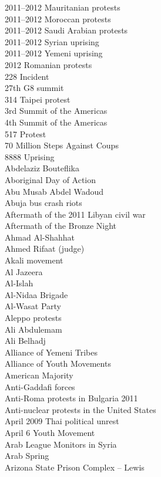 2011–2012 Mauritanian protests\\
2011–2012 Moroccan protests\\
2011–2012 Saudi Arabian protests\\
2011–2012 Syrian uprising\\
2011–2012 Yemeni uprising\\
2012 Romanian protests\\
228 Incident\\
27th G8 summit\\
314 Taipei protest\\
3rd Summit of the Americas\\
4th Summit of the Americas\\
517 Protest\\
70 Million Steps Against Coups\\
8888 Uprising\\
Abdelaziz Bouteflika\\
Aboriginal Day of Action\\
Abu Musab Abdel Wadoud\\
Abuja bus crash riots\\
Aftermath of the 2011 Libyan civil war\\
Aftermath of the Bronze Night\\
Ahmad Al-Shahhat\\
Ahmed Rifaat (judge)\\
Akali movement\\
Al Jazeera\\
Al-Islah\\
Al-Nidaa Brigade\\
Al-Wasat Party\\
Aleppo protests\\
Ali Abdulemam\\
Ali Belhadj\\
Alliance of Yemeni Tribes\\
Alliance of Youth Movements\\
American Majority\\
Anti-Gaddafi forces\\
Anti-Roma protests in Bulgaria 2011\\
Anti-nuclear protests in the United States\\
April 2009 Thai political unrest\\
April 6 Youth Movement\\
Arab League Monitors in Syria\\
Arab Spring\\
Arizona State Prison Complex – Lewis\\
